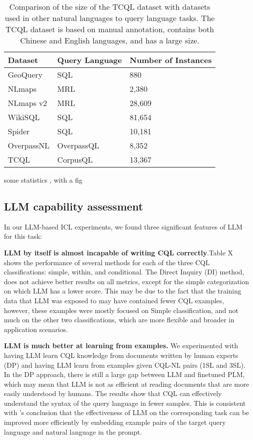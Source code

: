\documentclass[11pt]{article}
\begin{document}
\begin{CJK*}{UTF8}{gbsn}
\begin{table}[h!]
\centering
\begin{tabular}{lp{5em}p{5em}}
\toprule
\textbf{Dataset} & \textbf{Query Language} & \textbf{Number of Instances} \\
\midrule
GeoQuery & SQL & 880 \\
NLmaps & MRL & 2,380 \\
NLmaps v2 & MRL & 28,609 \\
WikiSQL & SQL & 81,654 \\
Spider & SQL & 10,181 \\
OverpassNL & OverpassQL & 8,352 \\
\hline
TCQL & CorpusQL & 13,367
\\
\hline
\end{tabular}
\caption{Comparison of the size of the TCQL dataset with datasets used in other natural languages to query language tasks. The TCQL dataset is based on manual annotation, contains both Chinese and English languages, and has a large size.}
\label{tab:datasetCompare}
\end{table}

some statistics , with a fig

\subsection{LLM capability assessment}
In our LLM-based ICL experiments, we found three significant features of LLM for this task:

\textbf{LLM by itself is almost incapable of writing CQL correctly}.Table X shows the performance of several methods for each of the three CQL classifications: simple, within, and conditional. The Direct Inquiry (DI) method, does not achieve better results on all metrics, except for the simple categorization on which LLM has a lower score. This may be due to the fact that the training data that LLM was exposed to may have contained fewer CQL examples, however, these examples were mostly focused on Simple classification, and not much on the other two classifications, which are more flexible and broader in application scenarios.

\textbf{LLM is much better at learning from examples.} We experimented with having LLM learn CQL knowledge from documents written by human experts (DP) and having LLM learn from examples given CQL-NL pairs (1SL and 3SL). In the DP approach, there is still a large gap between LLM and finetuned PLM, which may mean that LLM is not as efficient at reading documents that are more easily understood by humans. The results show that CQL can effectively understand the syntax of the query language in fewer samples. This is consistent with \citet{staniek2023texttooverpassql}'s conclusion that the effectiveness of LLM on the corresponding task can be improved more efficiently by embedding example pairs of the target query language and natural language in the prompt.


\end{CJK*}
\end{document}
